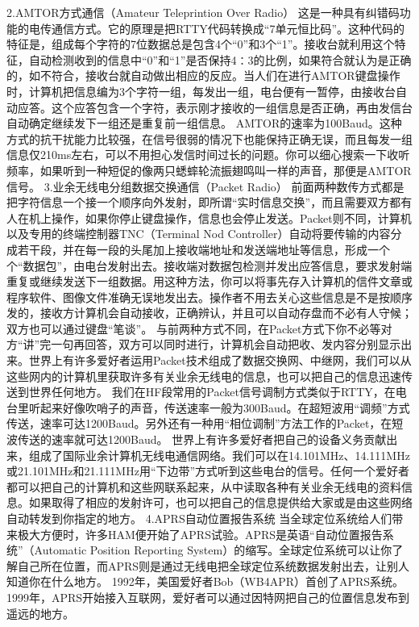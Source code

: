 \documentclass[12pt,UTF8]{ctexbook}
\begin{document}
2.AMTOR方式通信（Amateur Teleprintion Over Radio）
这是一种具有纠错码功能的电传通信方式。它的原理是把RTTY代码转换成“7单元恒比码”。这种代码的特征是，组成每个字符的7位数据总是包含4个“0”和3个“1”。接收台就利用这个特征，自动检测收到的信息中“0”和“1”是否保持4∶3的比例，如果符合就认为是正确的，如不符合，接收台就自动做出相应的反应。当人们在进行AMTOR键盘操作时，计算机把信息编为3个字符一组，每发出一组，电台便有一暂停，由接收台自动应答。这个应答包含一个字符，表示刚才接收的一组信息是否正确，再由发信台自动确定继续发下一组还是重复前一组信息。
AMTOR的速率为100Baud。这种方式的抗干扰能力比较强，在信号很弱的情况下也能保持正确无误，而且每发一组信息仅210ms左右，可以不用担心发信时间过长的问题。你可以细心搜索一下收听频率，如果听到一种短促的像两只蟋蟀轮流振翅鸣叫一样的声音，那便是AMTOR信号。
3.业余无线电分组数据交换通信（Packet Radio）
前面两种数传方式都是把字符信息一个接一个顺序向外发射，即所谓“实时信息交换”，而且需要双方都有人在机上操作，如果你停止键盘操作，信息也会停止发送。Packet则不同，计算机以及专用的终端控制器TNC（Terminal Nod Controller）自动将要传输的内容分成若干段，并在每一段的头尾加上接收端地址和发送端地址等信息，形成一个个“数据包”，由电台发射出去。接收端对数据包检测并发出应答信息，要求发射端重复或继续发送下一组数据。用这种方法，你可以将事先存入计算机的信件文章或程序软件、图像文件准确无误地发出去。操作者不用去关心这些信息是不是按顺序发的，接收方计算机会自动接收，正确辨认，并且可以自动存盘而不必有人守候；双方也可以通过键盘“笔谈”。
与前两种方式不同，在Packet方式下你不必等对方“讲”完一句再回答，双方可以同时进行，计算机会自动把收、发内容分别显示出来。世界上有许多爱好者运用Packet技术组成了数据交换网、中继网，我们可以从这些网内的计算机里获取许多有关业余无线电的信息，也可以把自己的信息迅速传送到世界任何地方。
我们在HF段常用的Packet信号调制方式类似于RTTY，在电台里听起来好像吹哨子的声音，传送速率一般为300Baud。在超短波用“调频”方式传送，速率可达1200Baud。另外还有一种用“相位调制”方法工作的Packet，在短波传送的速率就可达1200Baud。
世界上有许多爱好者把自己的设备义务贡献出来，组成了国际业余计算机无线电通信网络。我们可以在14.101MHz、14.111MHz或21.101MHz和21.111MHz用“下边带”方式听到这些电台的信号。任何一个爱好者都可以把自己的计算机和这些网联系起来，从中读取各种有关业余无线电的资料信息。如果取得了相应的发射许可，也可以把自己的信息提供给大家或是由这些网络自动转发到你指定的地方。
4.APRS自动位置报告系统
当全球定位系统给人们带来极大方便时，许多HAM便开始了APRS试验。APRS是英语“自动位置报告系统”（Automatic Position Reporting System）的缩写。全球定位系统可以让你了解自己所在位置，而APRS则是通过无线电把全球定位系统数据发射出去，让别人知道你在什么地方。
1992年，美国爱好者Bob（WB4APR）首创了APRS系统。1999年，APRS开始接入互联网，爱好者可以通过因特网把自己的位置信息发布到遥远的地方。
\end{document}
